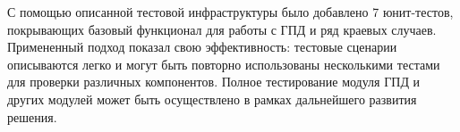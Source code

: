 С помощью описанной тестовой инфраструктуры было добавлено 7 юнит-тестов, покрывающих базовый функционал для работы с ГПД и ряд краевых случаев. Примененный подход показал свою эффективность: тестовые сценарии описываются легко и могут быть повторно использованы несколькими тестами для проверки различных компонентов. Полное тестирование модуля ГПД и других модулей может быть осуществлено в рамках дальнейшего развития решения.

\begin{listing}[htbp]
    \inputminted{c++}{listings/testing_dfg_builder.cpp}
    \caption{Класс для генерации тестовых ГПД.}
    \label{lst:testing_dfg_builder}
\end{listing}

\begin{listing}[htbp]
    \inputminted{c++}{listings/testing_dfg_collector.cpp}
    \caption{Класс-фикстура для юнит-тестирования класса DfgCollector.}
    \label{lst:testing_dfg_collector}
\end{listing}

\begin{listing}[htbp]
    \inputminted{c++}{listings/testing_dfg_collector_example.cpp}
    \caption{Пример юнит-теста для класса DfgCollector.}
    \label{lst:testing_dfg_collector_example}
\end{listing}

\FloatBarrier
